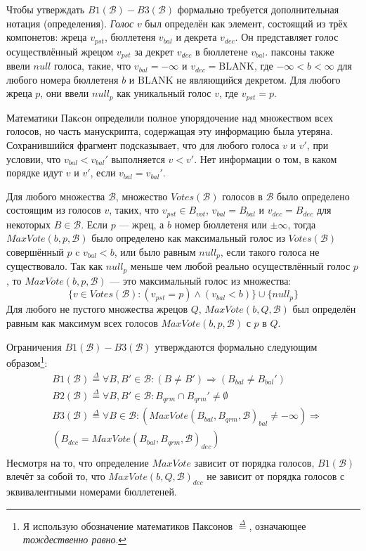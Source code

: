 \documentclass[12pt, a4paper]{article} %
\begin{document}
Чтобы утверждать $B1(\mathcal{B}) - B3(\mathcal{B})$ формально требуется дополнительная нотация (определения). \textit{Голос} $v$ был определён как элемент, состоящий из трёх компонетов: жреца $v_{pst}$, бюллетеня $v_{bal}$ и декрета $v_{dec}$. Он представляет голос осуществлённый жрецом $v_{pst}$ за декрет $v_{dec}$ в бюллетене $v_{bal}$. паксоны также ввели $null$ голоса, такие, что $v_{bal}=-\infty$ и $v_{dec}=\mathrm{BLANK}$, где $-\infty < b < \infty$ для любого номера бюллетеня $b$ и $\mathrm{BLANK}$ не являющийся декретом. Для любого жреца $p$, они ввели $null_p$ как уникальный голос $v$, где $v_{pst}=p$.

Математики Пакcон определили полное упорядочение над множеством всех голосов, но часть манускрипта, содержащая эту информацию была утеряна. Сохранившийся фрагмент подсказывает, что для любого голоса $v$ и $v'$, при условии, что $v_{bal} < v_{bal}'$ выполняется $v < v'$. Нет информации о том, в каком порядке идут $v$ и $v'$, если $v_{bal} = v_{bal}'$.

Для любого множества $\mathcal{B}$, множество $Votes(\mathcal{B})$ голосов в $\mathcal{B}$ было определено состоящим из голосов $v$, таких, что $v_{pst} \in B_{vot}$, $v_{bal} = B_{bal}$ и $v_{dec} = B_{dec}$ для некоторых $B \in \mathcal{B}$. Если $p$ --- жрец, а $b$ номер бюллетеня или $\pm \infty$, тогда $MaxVote(b, p, \mathcal{B})$ было определено как максимальный голос из $Votes(\mathcal{B})$ совершённый $p$ c $v_{bal} < b$, или было равным $null_p$, если такого голоса не существовало. Так как $null_p$ меньше чем любой реально осуществлённый голос $p$, то $MaxVote(b,p, \mathcal{B})$ --- это максимальный голос из множества:
\[  
    \{v \in Votes(\mathcal{B}) : (v_{pst} = p) \land (v_{bal} < b)\} \cup \{null_p\}
\]
Для любого не пустого множества жрецов $Q$, $MaxVote(b, Q, \mathcal{B})$ был определён равным как максимум всех голосов $MaxVote(b, p, \mathcal{B})$ с $p$ в $Q$.

Ограничения  $B1(\mathcal{B}) - B3(\mathcal{B})$ утверждаются формально следующим образом\footnote{Я использую обозначение математиков Паксонов $\overset{\Delta}{=}$, означающее \textit{тождественно равно}.}:
\begin{align*}
    &B1(\mathcal{B}) \overset{\Delta}{=} \forall B, B' \in \mathcal{B} : (B \neq B') \Rightarrow (B_{bal} \neq B_{bal}') \\
    &B2(\mathcal{B}) \overset{\Delta}{=} \forall B, B' \in \mathcal{B} : B_{qrm} \cap B_{qrm}' \neq \emptyset \\
    &B3(\mathcal{B}) \overset{\Delta}{=} \forall B \in \mathcal{B} : (MaxVote(B_{bal}, B_{qrm}, \mathcal{B})_{bal} \neq - \infty) \Rightarrow \\
    &(B_{dec} = MaxVote(B_{bal}, B_{qrm}, \mathcal{B})_{dec}) \\
\end{align*}
Несмотря на то, что определение $MaxVote$ зависит от порядка голосов, $B1(\mathcal{B})$ влечёт за собой то, что $MaxVote(b, Q, \mathcal{B})_{dec}$ не зависит от порядка голосов с эквивалентными номерами бюллетеней.
\end{document}
